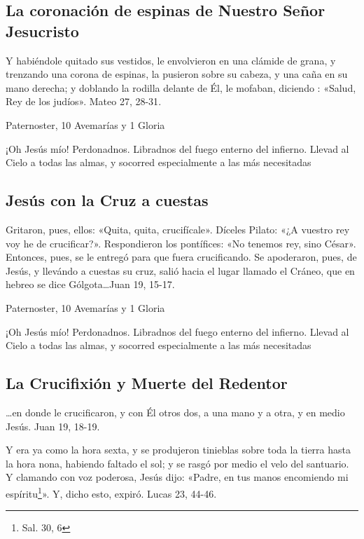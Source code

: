 \documentclass[a4paper,11pt, oneside]{report}
\begin{document}
      \subsection{La coronación de espinas de Nuestro Señor Jesucristo}

        Y habiéndole quitado sus vestidos, le envolvieron en una clámide de grana, y trenzando una corona de espinas, la pusieron sobre su cabeza, y una
        caña en su mano derecha; y doblando la rodilla delante de Él, le mofaban, diciendo : «Salud, Rey de los judíos». Mateo 27, 28-31\cite{bover-cantera}.
        
        \smallskip
         Paternoster, 10 Avemarías y 1 Gloria
        
        \smallskip
        ¡Oh Jesús mío! Perdonadnos. Libradnos del fuego enterno del infierno. Llevad al Cielo a todas las almas, y socorred especialmente a las más 
        necesitadas
    
      \subsection{Jesús con la Cruz a cuestas}
        Gritaron, pues, ellos: «Quita, quita, crucifícale». Díceles Pilato: «¿A vuestro rey voy he de crucificar?». Respondieron los pontífices: «No tenemos rey,
        sino César». Entonces, pues, se le entregó para que fuera crucificando. Se apoderaron, pues, de Jesús, y llevándo a cuestas su cruz, salió hacia el lugar
        llamado el Cráneo, que en hebreo se dice Gólgota\ldots Juan 19, 15-17\cite{bover-cantera}.

        \smallskip
         Paternoster, 10 Avemarías y 1 Gloria
        
        \smallskip
        ¡Oh Jesús mío! Perdonadnos. Libradnos del fuego enterno del infierno. Llevad al Cielo a todas las almas, y socorred especialmente a las más 
        necesitadas
      
      \subsection{La Crucifixión y Muerte del Redentor}
        {\ldots}en donde le crucificaron, y con Él otros dos, a una mano y a otra, y en medio Jesús. Juan 19, 18-19\cite{bover-cantera}.

        \smallskip
        Y era ya como la hora sexta, y se produjeron tinieblas sobre toda la tierra hasta la hora nona, habiendo faltado el sol; y se rasgó por medio 
        el velo del santuario. Y clamando con voz poderosa, Jesús dijo: «Padre, en tus manos encomiendo mi espíritu\footnote{Sal. 30, 6}». 
        Y, dicho esto, expiró. Lucas 23, 44-46\cite{bover-cantera}.
        
\end{document}

